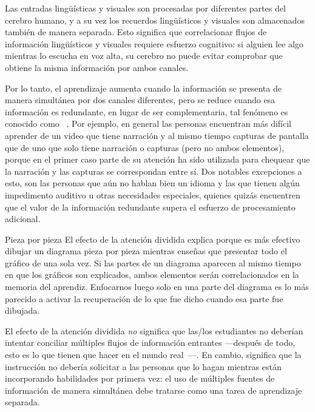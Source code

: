 Las entradas lingüísticas y visuales son procesadas por diferentes partes del cerebro humano,
y a su vez los recuerdos lingüísticos y visuales son almacenados también de manera separada.
Esto significa que correlacionar flujos de información lingüísticos y visuales requiere esfuerzo cognitivo:
si alguien lee algo mientras lo escucha en voz alta,
su cerebro no puede evitar comprobar que obtiene la misma información por ambos canales.

Por lo tanto, el aprendizaje aumenta cuando la información se presenta de manera simultánea por dos canales diferentes,
pero se reduce cuando esa información es redundante, en lugar de ser complementaria,
tal fenómeno es conocido como ~\cite{Maye2003}.
Por ejemplo, en general las personas encuentran más difícil aprender de un video que tiene narración y
al mismo tiempo capturas de pantalla que de uno que solo tiene narración o capturas (pero no ambos elementos),
porque en el primer caso parte de su atención ha sido utilizada para chequear que la narración  
y las capturas se correspondan entre sí. Dos notables excepciones a esto,
son las personas que aún no hablan bien un idioma y las que tienen algún impedimento auditivo u
otras necesidades especiales, quienes quizás encuentren que el valor de la información redundante
supera el esfuerzo de procesamiento adicional.

\begin{aside}{Pieza por pieza}
  El efecto de la atención dividida explica porque es más efectivo dibujar un diagrama
  pieza por pieza mientras enseñas que presentar todo el gráfico de una sola vez.
  Si las partes de un diagrama aparecen al mismo tiempo en que los gráficos son explicados,
  ambos elementos serán correlacionados en la memoria del aprendiz.
  Enfocarnos luego solo en una parte del diagrama es lo más parecido a activar la recuperación
  de lo que fue dicho cuando esa parte fue dibujada.
\end{aside}

El efecto de la atención dividida \emph{no} significa
que las/los estudiantes no deberían intentar conciliar múltiples flujos de información entrantes —después de todo, esto es lo que tienen que hacer en el mundo real~\cite{Atki2000}—.
En cambio, significa que la instrucción no debería solicitar a las personas
que lo hagan mientras están incorporando habilidades por primera vez:
el uso de múltiples fuentes  de información de manera simultánea debe tratarse como una tarea de aprendizaje separada.

